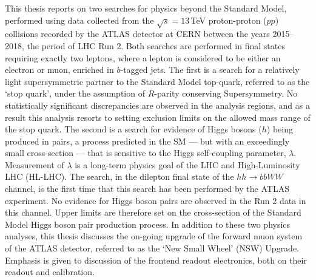 This thesis reports on two searches for physics beyond the Standard Model, performed using data collected from
the $\sqrt{s}=13$\,TeV proton-proton ($pp$) collisions recorded
by the ATLAS detector at CERN between the years 2015--2018, the period of LHC Run 2.
Both searches are performed in final states requiring exactly two leptons, where a lepton
is considered to be either an electron or muon, enriched in $b$-tagged jets.
The first is a search for a relatively light supersymmetric partner to the Standard Model
top-quark, referred to as the `stop quark', under the assumption of $R$-parity conserving Supersymmetry.
No statistically significant discrepancies are observed in the analysis regions, and as a result this
analysis resorts to setting exclusion limits on the allowed mass range of the stop quark.
The second is a search for evidence of Higgs bosons ($h$) being produced in pairs, a process
predicted in the SM --- but with an exceedingly small cross-section --- that is sensitive to the Higgs
self-coupling parameter, $\lambda$.
Measurement of $\lambda$ is a long-term physics goal of the LHC and High-Luminosity LHC (HL-LHC).
The search, in the dilepton final state of the $hh \rightarrow bbWW$ channel, is the first time that
this search has been performed by the ATLAS experiment.
No evidence for Higgs boson pairs are observed in the Run 2 data in this channel.
Upper limits are therefore set on the cross-section of the Standard Model Higgs boson pair production process.
In addition to these two physics analyses, this thesis discusses the on-going upgrade of the forward
muon system of the ATLAS detector, referred to as the `New Small Wheel' (NSW) Upgrade.
Emphasis is given to discussion of the frontend readout electronics, both on their readout and calibration.
